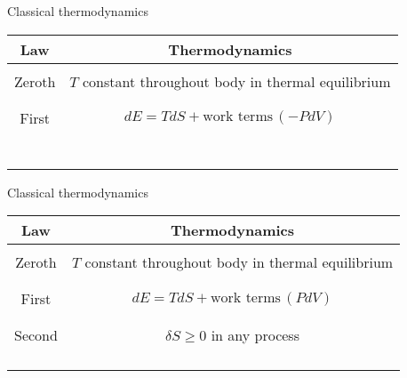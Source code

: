 \documentclass[compress,usenames,dvipsnames,8pt]{beamer}
\theoremstyle{definition}
\renewcommand{\(}{\begin{columns}}
\renewcommand{\)}{\end{columns}}
\newcommand{\<}[1]{\begin{column}{#1}}
\renewcommand{\>}{\end{column}}
\begin{document}
\begin{frame}{Classical thermodynamics}


\begin{center}
\begin{tabular}{|cc|}
\hline
Law & Thermodynamics \\
\hline \hline 
& \\
Zeroth & $T$ constant throughout body in thermal equilibrium\\ 
& \\ 
 \hline 
& \\
 First & $dE=TdS+\text{work terms}\,(-PdV)$  \\
& \\
\hline 
& \\
& \\
& \\
\hline
& \\
& \\
& \\
\hline
\end{tabular}
\end{center}

\addtocounter{framenumber}{-1}

\end{frame}



\begin{frame}{Classical thermodynamics}


\begin{center}
\begin{tabular}{|cc|}
\hline
Law & Thermodynamics \\
\hline \hline 
& \\
Zeroth & $T$ constant throughout body in thermal equilibrium\\ 
& \\ 
 \hline 
& \\
 First & $dE=TdS+\text{work terms}\,(PdV)$  \\
& \\
\hline 
& \\
Second & $\delta S\ge 0$ in any process \\
& \\
\hline
& \\
& \\
& \\
\hline
\end{tabular}
\end{center}
\addtocounter{framenumber}{-1}

\end{frame}
\end{document}

